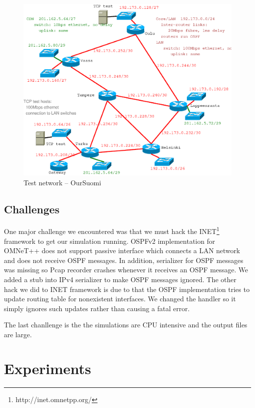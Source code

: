 \documentclass[conference,a4paper]{../../sty/IEEEtran}
\begin{document}
\begin{figure}[h]
\begin{center}
\includegraphics[scale=0.5]{plan.eps}
\caption{Test network -- OurSuomi}
\label{fig1}
\end{center}
\end{figure}


\subsection{Challenges}
One major challenge we encountered was that we must hack the INET\footnote{http://inet.omnetpp.org/} framework to get our simulation running.
OSPFv2 implementation for OMNeT++ does not support passive interface which connects a LAN network and does not receive OSPF messages.
In addition, serializer for OSPF messages was missing so Pcap recorder crashes whenever it receives an OSPF message.
We added a stub into IPv4 serializer to make OSPF messages ignored.
The other hack we did to INET framework is due to that the OSPF implementation tries to update routing table for nonexistent interfaces.
We changed the handler so it simply ignores such updates rather than causing a fatal error.

The last chanllenge is the the simulations are CPU intensive and the output files are large.


\section{Experiments}
\end{document}
